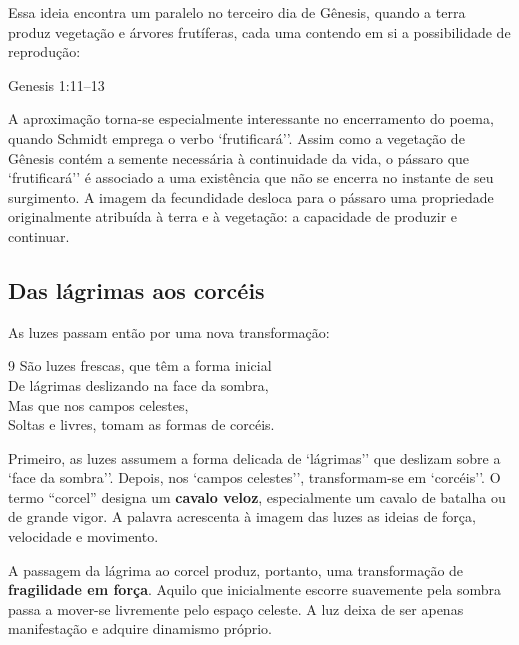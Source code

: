 Essa ideia encontra um paralelo no terceiro dia de Gênesis, quando a terra
produz vegetação e árvores frutíferas, cada uma contendo em si a possibilidade
de reprodução:

\begin{biblequote}[0.6\textwidth][11]{Genesis 1:11--13}
\end{biblequote}

A aproximação torna-se especialmente interessante no encerramento do poema,
quando Schmidt emprega o verbo `frutificará''. Assim como a vegetação de
Gênesis contém a semente necessária à continuidade da vida, o pássaro que
`frutificará'' é associado a uma existência que não se encerra no instante de
seu surgimento. A imagem da fecundidade desloca para o pássaro uma propriedade
originalmente atribuída à terra e à vegetação: a capacidade de produzir e
continuar.

\subsection{Das lágrimas aos corcéis}

As luzes passam então por uma nova transformação:

\begin{poemquote}[0.49\textwidth]{9}
São luzes frescas, que têm a forma inicial \\
De lágrimas deslizando na face da sombra, \\
Mas que nos campos celestes, \\
Soltas e livres, tomam as formas de corcéis.
\end{poemquote}

Primeiro, as luzes assumem a forma delicada de `lágrimas'' que deslizam sobre
a `face da sombra''. Depois, nos `campos celestes'', transformam-se em
`corcéis''. O termo ``corcel'' designa um \textbf{cavalo veloz}, especialmente
um cavalo de batalha ou de grande vigor. A palavra acrescenta à imagem das
luzes as ideias de força, velocidade e movimento.

A passagem da lágrima ao corcel produz, portanto, uma transformação de
\textbf{fragilidade em força}. Aquilo que inicialmente escorre suavemente pela
sombra passa a mover-se livremente pelo espaço celeste. A luz deixa de ser
apenas manifestação e adquire dinamismo próprio.


